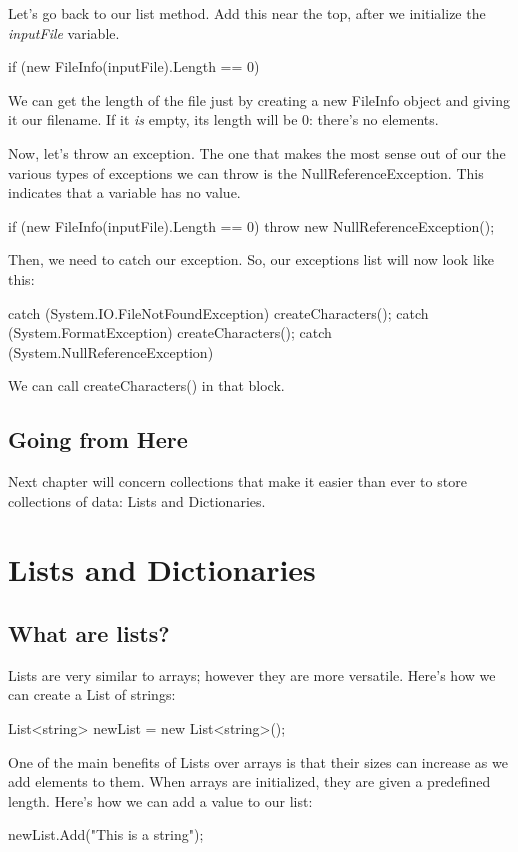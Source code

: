 \documentclass[oneside, openany] {book}
\begin{document}
Let's go back to our list method. Add this near the top, after we initialize the \emph{inputFile} variable.
\begin{CSharp}

if (new FileInfo(inputFile).Length == 0)
{
}
\end{CSharp}
We can get the length of the file just by creating a new FileInfo object and giving it our filename. If it \emph{is} empty, its length will be 0: there's no elements.

Now, let's throw an exception. The one that makes the most sense out of our the various types of exceptions we can throw is the NullReferenceException. This indicates that a variable has no value.

\begin{CSharp}
if (new FileInfo(inputFile).Length == 0)
{
  throw new NullReferenceException();
}
\end{CSharp}

Then, we need to catch our exception. So, our exceptions list will now look like this:

\begin{CSharp}
catch (System.IO.FileNotFoundException)
{
  createCharacters();
}
catch (System.FormatException)
{
  createCharacters();
}
catch (System.NullReferenceException)
{
}
\end{CSharp}

We can call createCharacters() in that block.

\section*{Going from Here}
Next chapter will concern collections that make it easier than ever to store collections of data: Lists and Dictionaries.
\chapter{Lists and Dictionaries}
\minitoc
{}
\section{What are lists?}
Lists are very similar to arrays; however they are more versatile. Here's how we can create a List of strings:

\begin{CSharp}
List<string> newList = new List<string>();
\end{CSharp}

One of the main benefits of Lists over arrays is that their sizes can increase as we add elements to them. When arrays are initialized, they are given a predefined length. Here's how we can add a value to our list:
\begin{CSharp}
newList.Add("This is a string");
\end{CSharp}
\end{document}
